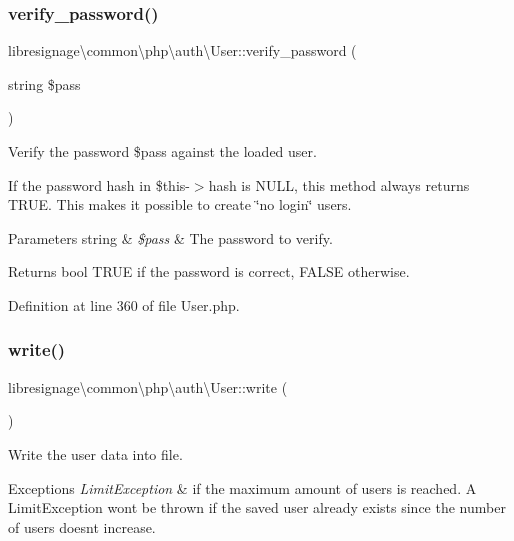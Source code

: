 \subsubsection{\texorpdfstring{verify\+\_\+password()}{verify\_password()}}
{\footnotesize\ttfamily libresignage\textbackslash{}common\textbackslash{}php\textbackslash{}auth\textbackslash{}\+User\+::verify\+\_\+password (\begin{DoxyParamCaption}\item[{string}]{\$pass }\end{DoxyParamCaption})}

Verify the password \$pass against the loaded user.

If the password hash in \$this-\/$>$hash is N\+U\+LL, this method always returns T\+R\+UE. This makes it possible to create \char`\"{}no login\char`\"{} users.


\begin{DoxyParams}[1]{Parameters}
string & {\em \$pass} & The password to verify. \\
\hline
\end{DoxyParams}
\begin{DoxyReturn}{Returns}
bool T\+R\+UE if the password is correct, F\+A\+L\+SE otherwise. 
\end{DoxyReturn}


Definition at line 360 of file User.\+php.

\mbox{\label{classlibresignage_1_1common_1_1php_1_1auth_1_1User_a9999be727981f0fef395fe0e95b6314d}} 
\subsubsection{\texorpdfstring{write()}{write()}}
{\footnotesize\ttfamily libresignage\textbackslash{}common\textbackslash{}php\textbackslash{}auth\textbackslash{}\+User\+::write (\begin{DoxyParamCaption}{ }\end{DoxyParamCaption})}

Write the user data into file.


\begin{DoxyExceptions}{Exceptions}
{\em Limit\+Exception} & if the maximum amount of users is reached. A Limit\+Exception won\textquotesingle{}t be thrown if the saved user already exists since the number of users doesn\textquotesingle{}t increase. \\
\hline
\end{DoxyExceptions}


